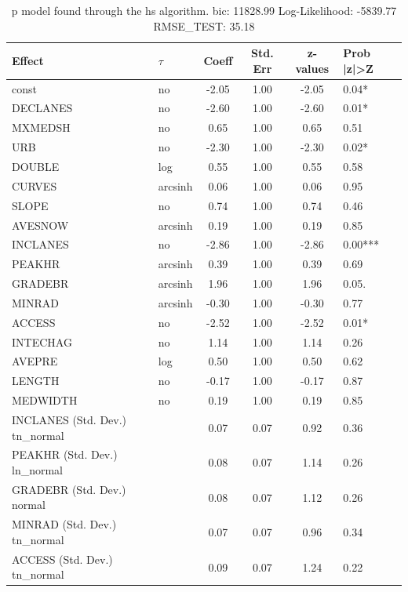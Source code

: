 \begin{table}
	\caption{p model found through the hs algorithm. bic: 11828.99 Log-Likelihood: -5839.77 RMSE_TEST: 35.18}
	\begin{center}
		\begin{tabular}{|l|l|c|c|c|l|}
			\hline
			Effect & $\tau$ & Coeff & Std. Err & z-values & Prob |z|>Z \\
			\hline
			const & no & -2.05 & 1.00 & -2.05 & 0.04* \\
			\hline
			DECLANES & no & -2.60 & 1.00 & -2.60 & 0.01* \\
			\hline
			MXMEDSH & no & 0.65 & 1.00 & 0.65 & 0.51 \\
			\hline
			URB & no & -2.30 & 1.00 & -2.30 & 0.02* \\
			\hline
			DOUBLE & log & 0.55 & 1.00 & 0.55 & 0.58 \\
			\hline
			CURVES & arcsinh & 0.06 & 1.00 & 0.06 & 0.95 \\
			\hline
			SLOPE & no & 0.74 & 1.00 & 0.74 & 0.46 \\
			\hline
			AVESNOW & arcsinh & 0.19 & 1.00 & 0.19 & 0.85 \\
			\hline
			INCLANES & no & -2.86 & 1.00 & -2.86 & 0.00*** \\
			\hline
			PEAKHR & arcsinh & 0.39 & 1.00 & 0.39 & 0.69 \\
			\hline
			GRADEBR & arcsinh & 1.96 & 1.00 & 1.96 & 0.05. \\
			\hline
			MINRAD & arcsinh & -0.30 & 1.00 & -0.30 & 0.77 \\
			\hline
			ACCESS & no & -2.52 & 1.00 & -2.52 & 0.01* \\
			\hline
			INTECHAG & no & 1.14 & 1.00 & 1.14 & 0.26 \\
			\hline
			AVEPRE & log & 0.50 & 1.00 & 0.50 & 0.62 \\
			\hline
			LENGTH & no & -0.17 & 1.00 & -0.17 & 0.87 \\
			\hline
			MEDWIDTH & no & 0.19 & 1.00 & 0.19 & 0.85 \\
			\hline
			INCLANES (Std. Dev.) tn_normal &  & 0.07 & 0.07 & 0.92 & 0.36 \\
			\hline
			PEAKHR (Std. Dev.) ln_normal &  & 0.08 & 0.07 & 1.14 & 0.26 \\
			\hline
			GRADEBR (Std. Dev.) normal &  & 0.08 & 0.07 & 1.12 & 0.26 \\
			\hline
			MINRAD (Std. Dev.) tn_normal &  & 0.07 & 0.07 & 0.96 & 0.34 \\
			\hline
			ACCESS (Std. Dev.) tn_normal &  & 0.09 & 0.07 & 1.24 & 0.22 \\

\end{tabular}
\end{center}
\end{table}
